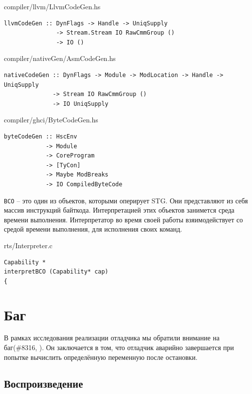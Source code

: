 \documentclass[fontsize=14pt, paper=a4, pagesize, DIV=calc]{scrartcl}
\def\code#1{\texttt{#1}}
\begin{document}
\begin{ListingEnv}
\caption{compiler/llvm/LlvmCodeGen.hs}
\begin{lstlisting}[firstnumber=44]
llvmCodeGen :: DynFlags -> Handle -> UniqSupply
               -> Stream.Stream IO RawCmmGroup ()
               -> IO ()
\end{lstlisting}
\end{ListingEnv}

\begin{ListingEnv}
\caption{compiler/nativeGen/AsmCodeGen.hs}
\begin{lstlisting}[firstnumber=108]
nativeCodeGen :: DynFlags -> Module -> ModLocation -> Handle -> UniqSupply
              -> Stream IO RawCmmGroup ()
              -> IO UniqSupply
\end{lstlisting}
\end{ListingEnv}

\begin{ListingEnv}
\caption{compiler/ghci/ByteCodeGen.hs}
\begin{lstlisting}[firstnumber=81]
byteCodeGen :: HscEnv
            -> Module
            -> CoreProgram
            -> [TyCon]
            -> Maybe ModBreaks
            -> IO CompiledByteCode
\end{lstlisting}
\end{ListingEnv}

\code{BCO} -- это один из объектов, которыми оперирует STG. Они представляют из
себя массив инструкций байткода. Интерпретацией этих объектов занимется среда
времени выполнения. Интерпретатор во время своей работы взяимодействует со
средой времени выполнения, для исполнения своих команд.

\begin{ListingEnv}
\caption{rts/Interpreter.c}
\begin{lstlisting}[firstnumber=295]
Capability *
interpretBCO (Capability* cap)
{
\end{lstlisting}
\end{ListingEnv}

\section{Баг}

В рамках исследования реализации отладчика мы обратили внимание на баг(\#{}8316,
\cite{bug}). Он заключается в том, что отладчик аварийно завершается при попытке
вычислить определённую переменную после остановки.

\subsection{Воспроизведение}
\end{document}
